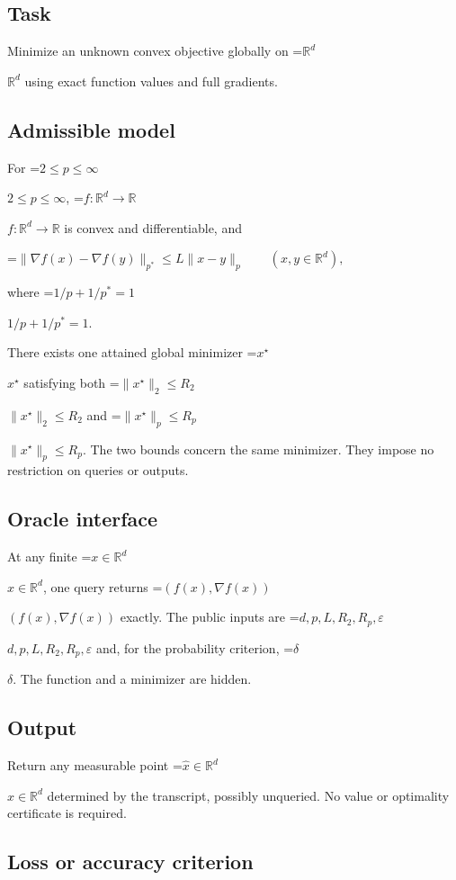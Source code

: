\documentclass[10pt,a4paper]{article}
\newcommand{\AtlasMath}[1]{\par\begingroup\centering\setbox0=\hbox{$\displaystyle #1$}\ifdim\wd0>1.4\linewidth\typeout{ATLAS WIDE FORMULA: \the\wd0}\fi\ifdim\wd0>\linewidth\resizebox{\linewidth}{!}{\box0}\else\box0\fi\par\endgroup}
\newcommand{\AtlasInlineMath}[1]{\begingroup\setbox0=\hbox{$#1$}\ifdim\wd0>.4\linewidth\endgroup\AtlasMath{#1}\else\endgroup$#1$\fi}
\begin{document}
\subsection{Task}


Minimize an unknown convex objective globally on \AtlasInlineMath{\mathbb R^d} using exact function values and full gradients.



\subsection{Admissible model}


For \AtlasInlineMath{2\le p\le\infty}, \AtlasInlineMath{f:\mathbb R^d\to\mathbb R} is convex and differentiable, and
\AtlasMath{\|\nabla f(x)-\nabla f(y)\|_{p^*}\le L\|x-y\|_p\qquad(x,y\in\mathbb R^d),}
 where \AtlasInlineMath{1/p+1/p^*=1}.



There exists one attained global minimizer \AtlasInlineMath{x^\star} satisfying both \AtlasInlineMath{\|x^\star\|_2\le R_2} and \AtlasInlineMath{\|x^\star\|_p\le R_p}. The two bounds concern the same minimizer. They impose no restriction on queries or outputs.



\subsection{Oracle interface}


At any finite \AtlasInlineMath{x\in\mathbb R^d}, one query returns \AtlasInlineMath{(f(x),\nabla f(x))} exactly. The public inputs are \AtlasInlineMath{d,p,L,R_2,R_p,\varepsilon} and, for the probability criterion, \AtlasInlineMath{\delta}. The function and a minimizer are hidden.



\subsection{Output}


Return any measurable point \AtlasInlineMath{\widehat x\in\mathbb R^d} determined by the transcript, possibly unqueried. No value or optimality certificate is required.



\subsection{Loss or accuracy criterion}
\end{document}
